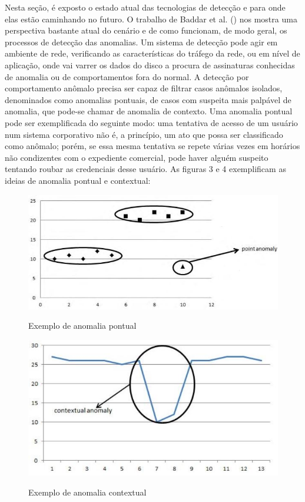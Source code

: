 Nesta seção, é exposto o estado atual das tecnologias de
detecção e para onde elas estão caminhando no futuro. O trabalho de
Baddar et al. (\citeyear{baddarxx}) nos mostra uma perspectiva bastante atual do cenário e
de como funcionam, de modo geral, os processos de detecção das anomalias. Um
sistema de detecção pode agir em ambiente de rede, verificando as
características do tráfego da rede, ou em nível de aplicação, onde vai varrer
os dados do disco a procura de assinaturas conhecidas de anomalia ou de
comportamentos fora do normal. A detecção por comportamento anômalo precisa
ser capaz de filtrar casos anômalos isolados, denominados como anomalias
pontuais, de casos com suspeita mais palpável de anomalia, que pode-se chamar de
anomalia de contexto. Uma anomalia pontual pode ser exemplificada do seguinte
modo: uma tentativa de acesso de um usuário num sistema corporativo não é, a
princípio, um ato que possa ser classificado como anômalo; porém, se essa
mesma tentativa se repete várias vezes em horários não condizentes com o
expediente comercial, pode haver alguém suspeito tentando roubar as
credenciais desse usuário. As figuras 3 e 4 exemplificam as ideias de
anomalia pontual e contextual:

\begin{figure}[H]
\caption{\small Exemplo de anomalia pontual}
\centering
\includegraphics[scale=0.5]{figs/anomalia_pontual.JPG}
\label{f.anomalia_pontual}
\end{figure}

\begin{figure}[H]
\caption{\small Exemplo de anomalia contextual}
\centering
\includegraphics[scale=0.5]{figs/anomalia_contextual.JPG}
\label{f.contextual}
\end{figure}

